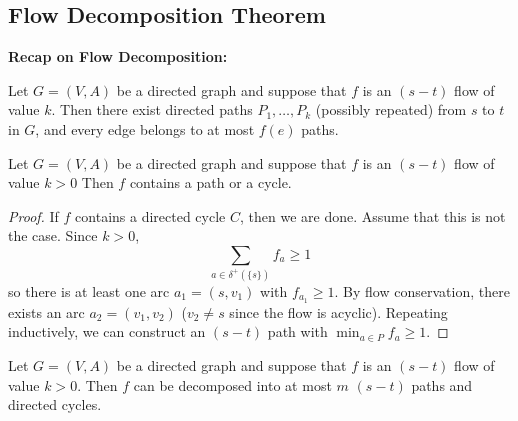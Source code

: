  	\subsection{Flow Decomposition Theorem}
 	\begin{marginfigure}
	\textbf{Recap on Flow Decomposition:}

	\noindent Let $G = (V, A)$ be a directed graph and suppose that $f$ is an $(s-t)$ flow of value $k$. Then there exist directed paths $P_1, \dots, P_k$ (possibly repeated) from $s$ to $t$ in $G$, and every edge belongs to at most $f(e)$ paths.
	\end{marginfigure}

	\begin{lem}
		Let $G = (V, A)$ be a directed graph and suppose that $f$ is an $(s-t)$ flow of value $k > 0$ Then $f$ contains a path or a cycle.
	\label{fdtlemma}
	\end{lem}

	\begin{proof}
		If $f$ contains a directed cycle $C$, then we are done. Assume that this is not the case. Since $k > 0$,
		\[ \sum_{a \in \delta^+(\{s\})}f_a \geq 1\]
		\noindent so there is at least one arc $a_1 = (s, v_1)$ with $f_{a_1} \geq 1$. By flow conservation, there exists an arc $a_2 = (v_1, v_2)$ ($v_2 \neq s$ since the flow is acyclic). Repeating inductively, we can construct an $(s-t)$ path with $\min_{a \in P}f_a \geq 1$.
	\end{proof}

	\begin{thm}
		Let $G = (V, A)$ be a directed graph and suppose that $f$ is an $(s-t)$ flow of value $k > 0$. Then $f$ can be decomposed into at most $m$ $(s-t)$ paths and directed cycles.
	\end{thm}

